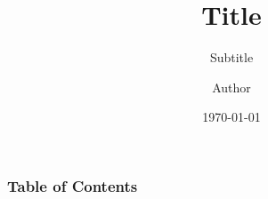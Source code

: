 \documentclass[UTF8]{ctexbeamer}
\title{Title}
\subtitle{Subtitle}
\author{Author}
\institute{Institute}
\date{\today}
\begin{document}
\frame{\titlepage}
\begin{frame}
    \frametitle{Table of Contents}
    \tableofcontents
\end{frame}


\end{document}
